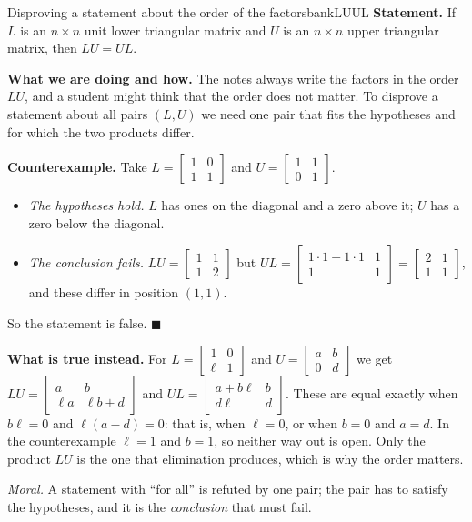\documentclass[11pt]{article}
\begin{document}
\begin{exmp}{Disproving a statement about the order of the factors}{bankLUUL}
\textbf{Statement.} If $L$ is an $n\times n$ unit lower triangular matrix and $U$ is an $n\times n$ upper triangular matrix, then $LU=UL$.

\textbf{What we are doing and how.} The notes always write the factors in the order $LU$, and a student might think that the order does not matter. To disprove a statement about all pairs $(L,U)$ we need one pair that fits the hypotheses and for which the two products differ.

\textbf{Counterexample.} Take $L=\begin{bmatrix}1&0\\1&1\end{bmatrix}$ and $U=\begin{bmatrix}1&1\\0&1\end{bmatrix}$.
\begin{itemize}
  \item \emph{The hypotheses hold.} $L$ has ones on the diagonal and a zero above it; $U$ has a zero below the diagonal.
  \item \emph{The conclusion fails.} $LU=\begin{bmatrix}1&1\\1&2\end{bmatrix}$ but $UL=\begin{bmatrix}1\cdot1+1\cdot1&1\\1&1\end{bmatrix}=\begin{bmatrix}2&1\\1&1\end{bmatrix}$, and these differ in position $(1,1)$.
\end{itemize}
So the statement is false. \qquad$\blacksquare$

\textbf{What is true instead.} For $L=\begin{bmatrix}1&0\\\ell&1\end{bmatrix}$ and $U=\begin{bmatrix}a&b\\0&d\end{bmatrix}$ we get $LU=\begin{bmatrix}a&b\\\ell a&\ell b+d\end{bmatrix}$ and $UL=\begin{bmatrix}a+b\ell&b\\d\ell&d\end{bmatrix}$. These are equal exactly when $b\ell=0$ and $\ell(a-d)=0$: that is, when $\ell=0$, or when $b=0$ and $a=d$. In the counterexample $\ell=1$ and $b=1$, so neither way out is open. Only the product $LU$ is the one that elimination produces, which is why the order matters.

\emph{Moral.} A statement with ``for all'' is refuted by one pair; the pair has to satisfy the hypotheses, and it is the \emph{conclusion} that must fail.
\end{exmp}
\end{document}
